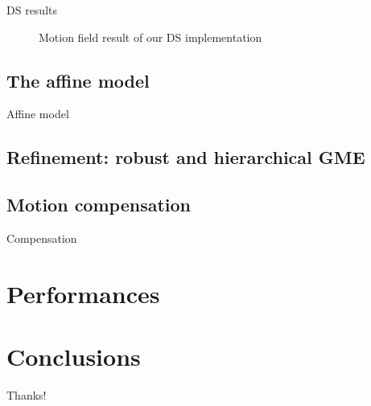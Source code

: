 \documentclass[aspectratio=1610,xcolor=dvipsnames]{beamer}
\begin{document}
\begin{frame}{DS results}
\begin{figure}[H]
\begin{minipage}[b]{0.45\textwidth}
            \label{fig:bbme-3-res}
		\end{minipage}
        \label{fig:bbme-3}
        \caption{Motion field result of our DS implementation}
	\end{figure}
\end{frame}

\subsection{The affine model}
\begin{frame}{Affine model}
    
\end{frame}

\subsection{Refinement: robust and hierarchical GME}
\subsection{Motion compensation}
\begin{frame}{Compensation}
    
\end{frame}

\section{Performances}

\section{Conclusions}

\begin{frame}
    \begin{center}
        {\Huge\calligra Thanks!}
    \end{center}
\end{frame}
\end{document}

